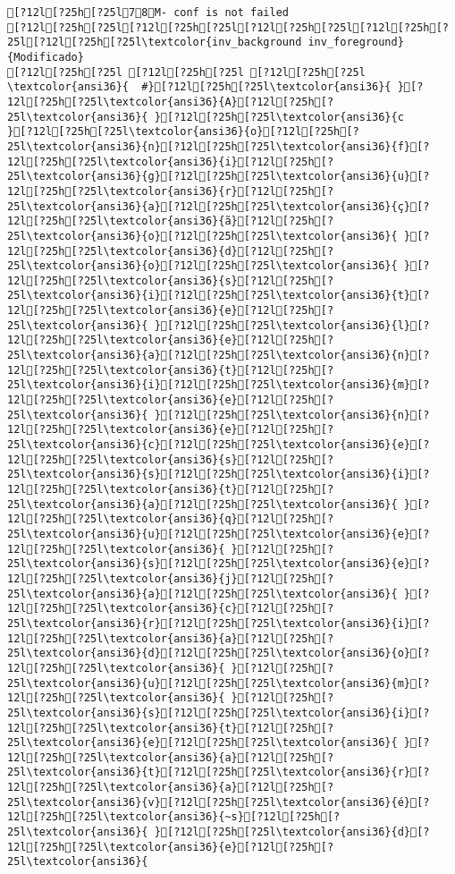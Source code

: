 \documentclass{scrartcl}
\begin{document}
\begin{Verbatim}
[?12l[?25h[?25l78M- conf is not failed
[?12l[?25h[?25l[?12l[?25h[?25l[?12l[?25h[?25l[?12l[?25h[?25l[?12l[?25h[?25l\textcolor{inv_background inv_foreground}{Modificado}
[?12l[?25h[?25l [?12l[?25h[?25l [?12l[?25h[?25l
\textcolor{ansi36}{  #}[?12l[?25h[?25l\textcolor{ansi36}{ }[?12l[?25h[?25l\textcolor{ansi36}{A}[?12l[?25h[?25l\textcolor{ansi36}{ }[?12l[?25h[?25l\textcolor{ansi36}{c
}[?12l[?25h[?25l\textcolor{ansi36}{o}[?12l[?25h[?25l\textcolor{ansi36}{n}[?12l[?25h[?25l\textcolor{ansi36}{f}[?12l[?25h[?25l\textcolor{ansi36}{i}[?12l[?25h[?25l\textcolor{ansi36}{g}[?12l[?25h[?25l\textcolor{ansi36}{u}[?12l[?25h[?25l\textcolor{ansi36}{r}[?12l[?25h[?25l\textcolor{ansi36}{a}[?12l[?25h[?25l\textcolor{ansi36}{ç}[?12l[?25h[?25l\textcolor{ansi36}{ã}[?12l[?25h[?25l\textcolor{ansi36}{o}[?12l[?25h[?25l\textcolor{ansi36}{ }[?12l[?25h[?25l\textcolor{ansi36}{d}[?12l[?25h[?25l\textcolor{ansi36}{o}[?12l[?25h[?25l\textcolor{ansi36}{ }[?12l[?25h[?25l\textcolor{ansi36}{s}[?12l[?25h[?25l\textcolor{ansi36}{i}[?12l[?25h[?25l\textcolor{ansi36}{t}[?12l[?25h[?25l\textcolor{ansi36}{e}[?12l[?25h[?25l\textcolor{ansi36}{ }[?12l[?25h[?25l\textcolor{ansi36}{l}[?12l[?25h[?25l\textcolor{ansi36}{e}[?12l[?25h[?25l\textcolor{ansi36}{a}[?12l[?25h[?25l\textcolor{ansi36}{n}[?12l[?25h[?25l\textcolor{ansi36}{t}[?12l[?25h[?25l\textcolor{ansi36}{i}[?12l[?25h[?25l\textcolor{ansi36}{m}[?12l[?25h[?25l\textcolor{ansi36}{e}[?12l[?25h[?25l\textcolor{ansi36}{ }[?12l[?25h[?25l\textcolor{ansi36}{n}[?12l[?25h[?25l\textcolor{ansi36}{e}[?12l[?25h[?25l\textcolor{ansi36}{c}[?12l[?25h[?25l\textcolor{ansi36}{e}[?12l[?25h[?25l\textcolor{ansi36}{s}[?12l[?25h[?25l\textcolor{ansi36}{s}[?12l[?25h[?25l\textcolor{ansi36}{i}[?12l[?25h[?25l\textcolor{ansi36}{t}[?12l[?25h[?25l\textcolor{ansi36}{a}[?12l[?25h[?25l\textcolor{ansi36}{ }[?12l[?25h[?25l\textcolor{ansi36}{q}[?12l[?25h[?25l\textcolor{ansi36}{u}[?12l[?25h[?25l\textcolor{ansi36}{e}[?12l[?25h[?25l\textcolor{ansi36}{ }[?12l[?25h[?25l\textcolor{ansi36}{s}[?12l[?25h[?25l\textcolor{ansi36}{e}[?12l[?25h[?25l\textcolor{ansi36}{j}[?12l[?25h[?25l\textcolor{ansi36}{a}[?12l[?25h[?25l\textcolor{ansi36}{ }[?12l[?25h[?25l\textcolor{ansi36}{c}[?12l[?25h[?25l\textcolor{ansi36}{r}[?12l[?25h[?25l\textcolor{ansi36}{i}[?12l[?25h[?25l\textcolor{ansi36}{a}[?12l[?25h[?25l\textcolor{ansi36}{d}[?12l[?25h[?25l\textcolor{ansi36}{o}[?12l[?25h[?25l\textcolor{ansi36}{ }[?12l[?25h[?25l\textcolor{ansi36}{u}[?12l[?25h[?25l\textcolor{ansi36}{m}[?12l[?25h[?25l\textcolor{ansi36}{ }[?12l[?25h[?25l\textcolor{ansi36}{s}[?12l[?25h[?25l\textcolor{ansi36}{i}[?12l[?25h[?25l\textcolor{ansi36}{t}[?12l[?25h[?25l\textcolor{ansi36}{e}[?12l[?25h[?25l\textcolor{ansi36}{ }[?12l[?25h[?25l\textcolor{ansi36}{a}[?12l[?25h[?25l\textcolor{ansi36}{t}[?12l[?25h[?25l\textcolor{ansi36}{r}[?12l[?25h[?25l\textcolor{ansi36}{a}[?12l[?25h[?25l\textcolor{ansi36}{v}[?12l[?25h[?25l\textcolor{ansi36}{é}[?12l[?25h[?25l\textcolor{ansi36}{~s}[?12l[?25h[?25l\textcolor{ansi36}{ }[?12l[?25h[?25l\textcolor{ansi36}{d}[?12l[?25h[?25l\textcolor{ansi36}{e}[?12l[?25h[?25l\textcolor{ansi36}{ 
\end{Verbatim}
\end{document}
